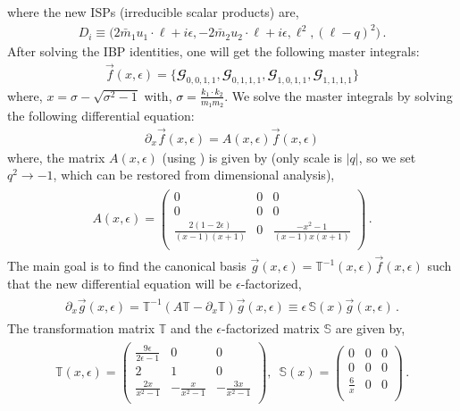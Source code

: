 where the new ISPs (irreducible scalar products) are,
\begin{align}
    D_{i}\equiv \Big(2\bar m_1 u_1\cdot \ell+i\epsilon, -2 \bar m_2u_2\cdot \ell+i\epsilon,\ell^2,(\ell-q)^2\Big)\,.
\end{align}
After solving the IBP identities, one will get the following master integrals:
\begin{align}
    \vec f(x,\epsilon)=\{\mathbfcal{G}_{0,0,1,1},\mathbfcal{G}_{0,1,1,1},\mathbfcal{G}_{1,0,1,1},\mathbfcal{G}_{1,1,1,1}\}
\end{align}
where, $x=\sigma-\sqrt{\sigma^2-1}$ with, \textcolor{black}{$\sigma=\frac{k_1\cdot k_2}{m_1m_2}$}. We solve the master integrals by solving the following differential equation:
\begin{align}
    \partial_{x}\vec f(x,\epsilon)=A(x,\epsilon)\vec f(x,\epsilon)
\end{align}
where, the matrix $A(x,\epsilon)$ (using \cite{Gituliar:2017vzm}) is given by (only scale is $|q|$, so we set $q^2\to -1$, which can be restored from dimensional analysis),
\begin{align}
    \begin{split}
        A(x,\epsilon)=\left(
\begin{array}{ccc}
 0 & 0 & 0 \\
 0 & 0 & 0 \\
 \frac{2 (1-2 \epsilon )}{(x-1) (x+1)} & 0 & \frac{-x^2-1}{(x-1) x (x+1)} \\
\end{array}
\right)\,.
    \end{split}
\end{align}
The main goal is to find the canonical basis $ \vec g(x,\epsilon)=\mathbb{T}^{-1}(x,\epsilon)\vec f(x,\epsilon)$ such that the new differential equation will be $\epsilon$-factorized,   
\begin{align}
    \begin{split}
\partial_{x} \vec g(x,\epsilon)=\mathbb{T}^{-1}(A \mathbb{T}-\partial_x \mathbb{T})\vec g(x,\epsilon)\equiv \epsilon\, \mathbb{S}(x) \vec g(x,\epsilon)\,.
    \end{split}
\end{align}
The transformation matrix $\mathbb{T}$ and the $\epsilon$-factorized matrix $\mathbb{S}$ are given by,
\begin{align}
    \begin{split}
        \mathbb{T}(x,\epsilon)=\left(
\begin{array}{ccc}
 \frac{9 \epsilon }{2 \epsilon -1} & 0 & 0 \\
 2 & 1 & 0 \\
 \frac{2 x}{x^2-1} & -\frac{x}{x^2-1} & -\frac{3 x}{x^2-1} \\
\end{array}
\right),\,\,\,\mathbb{S}(x)=\left(
\begin{array}{ccc}
 0 & 0 & 0 \\
 0 & 0 & 0 \\
 \frac{6  }{x} & 0 & 0 \\
\end{array}
\right)\,.
    \end{split}
\end{align}
